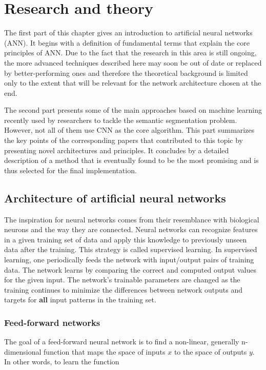 \chapter{Research and theory}
\label{research}
The first part of this chapter gives an introduction to artificial neural networks (ANN). It begins with a definition of fundamental terms that explain the core principles of ANN. Due to the fact that the research in this area is still ongoing, the more advanced techniques described here may soon be out of date or replaced by better-performing ones and therefore the theoretical background is limited only to the extent that will be relevant for the network architecture chosen at the end.

The second part presents some of the main approaches based on machine learning recently used by researchers to tackle the semantic segmentation problem. However, not all of them use CNN as the core algorithm. This part summarizes the key points of the corresponding papers that contributed to this topic by presenting novel architectures and principles. It concludes by a detailed description of a method that is eventually found to be the most promising and is thus selected for the final implementation.

\section{Architecture of artificial neural networks}

The inspiration for neural networks comes from their resemblance with biological neurons and the way they are connected. Neural networks can recognize features in a given training set of data and apply this knowledge to previously unseen data after the training. This strategy is called supervised learning. In supervised learning, one periodically feeds the network with input/output pairs of training data. The network learns by comparing the correct and computed output values for the given input. The network's trainable parameters are changed as the training continues to minimize the differences between network outputs and targets for \textbf{all} input patterns in the training set. \cite{mehlig}

\subsection{Feed-forward networks}

The goal of a feed-forward neural network is to find a non-linear, generally n-dimensional function that maps the space of inputs $ x $ to the space of outputs $ y $. In other words, to learn the function \cite{santiago}

